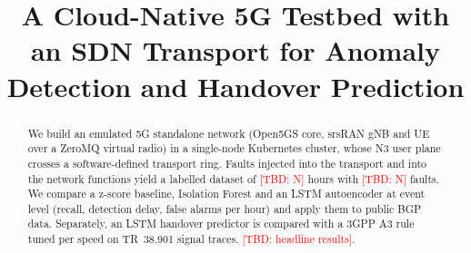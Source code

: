 \documentclass[conference]{IEEEtran}
\newcommand{\tbd}[1]{\textcolor{red}{[TBD: #1]}}
\begin{document}
\title{A Cloud-Native 5G Testbed with an SDN Transport for Anomaly Detection and Handover Prediction}
\author{}
\maketitle

\begin{abstract}
We build an emulated 5G standalone network (Open5GS core, srsRAN gNB and UE over a ZeroMQ virtual
radio) in a single-node Kubernetes cluster, whose N3 user plane crosses a software-defined transport
ring. Faults injected into the transport and into the network functions yield a labelled dataset of
\tbd{N} hours with \tbd{N} faults. We compare a z-score baseline, Isolation Forest and an LSTM
autoencoder at event level (recall, detection delay, false alarms per hour) and apply them to public
BGP data. Separately, an LSTM handover predictor is compared with a 3GPP A3 rule tuned per speed on
TR~38.901 signal traces. \tbd{headline results}.
\end{abstract}










\end{document}
